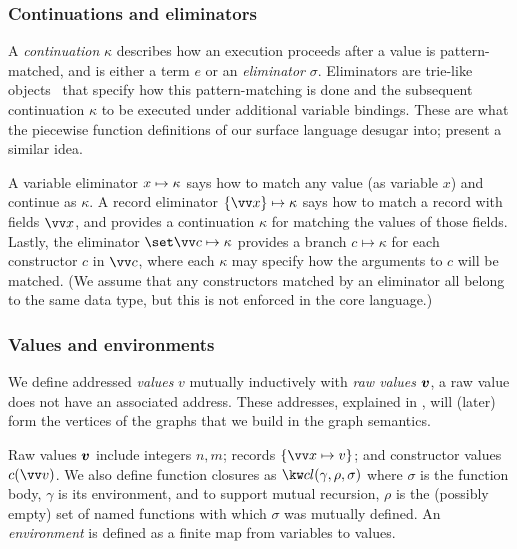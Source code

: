 \subsubsection{Continuations and eliminators}
\label{sec:core:continuations}
A \emph{continuation} $\kappa$ describes how an execution proceeds after a value is pattern-matched, and is
either a term $e$ or an \textit{eliminator} $\sigma$. Eliminators are trie-like objects~\cite{hinze00}
that specify how this pattern-matching is done and the subsequent continuation $\kappa$ to be executed under
additional variable bindings. These are what the piecewise function definitions of our surface language
desugar into; \citet{peytonjones2021} present a similar idea.

A variable eliminator ${x}\mapsto{\kappa}$ says how to match any value (as  variable $x$) and continue as
$\kappa$. A record eliminator $\elimRecord{\seq{x}}{\kappa}$ says how to match a record with fields $\seq{x}$,
and provides a continuation $\kappa$ for matching the values of those fields. Lastly, the eliminator
$\elimConstr{\seq{c \mapsto \kappa}}$ provides a branch $c \mapsto \kappa$ for each constructor $c$ in
$\seq{c}$, where each $\kappa$ may specify how the arguments to  $c$  will be matched. (We assume that any
constructors matched by an eliminator all belong to the same data type, but this is not enforced in the core
language.)

\subsubsection{Values and environments}
\label{sec:core:values}

We define addressed \emph{values} $v$ mutually inductively with \emph{raw values} $\bm{v}$,  a raw value does not have an associated address. These addresses, explained in
, will (later)  form the vertices of the graphs that we
build in the graph semantics.

Raw values $\bm{v}$ include integers $n, m$; records  $\exRecord{\seq{x \mapsto v}}$; and constructor values
$\exConstr{c}{\seq{v}}$. We also define function closures as $\exClosure{\gamma}{\rho}{\sigma}$ where $\sigma$
is the function body, $\gamma$ is its environment, and to support mutual recursion, ${\rho}$ is the (possibly
empty) set of named functions with which $\sigma$ was mutually defined. An \emph{environment} is defined as a
finite map from variables to values.

